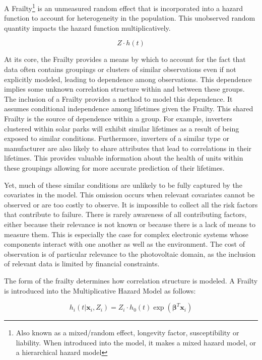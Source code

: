 A Frailty\footnote{Also known as a mixed/random effect, longevity factor, susceptibility or liability. When introduced into the model, it makes a mixed hazard model, or a hierarchical hazard model} is an unmeasured random effect that is incorporated into a hazard function to account for heterogeneity in the population\cite{Hosmer2008}. This unobserved random quantity impacts the hazard function multiplicatively.

$$ Z\cdot h(t) $$

At its core, the Frailty provides a means by which to account for the fact that data often contains groupings or clusters of similar observations even if not explicitly modeled, leading to dependence among observations. This dependence implies some unknown correlation structure within and between these groups. The inclusion of a Frailty provides a method to model this dependence. It assumes conditional independence among lifetimes given the Frailty. This shared Frailty is the source of dependence within a group\cite{Wienke2010}. For example, inverters clustered within solar parks will exhibit similar lifetimes as a result of being exposed to similar conditions. Furthermore, inverters of a similar type or manufacturer are also likely to share attributes that lead to correlations in their lifetimes. This provides valuable information about the health of units within these groupings allowing for more accurate prediction of their lifetimes.

Yet, much of these similar conditions are unlikely to be fully captured by the covariates in the model. This omission occurs when relevant covariates cannot be observed or are too costly to observe. It is impossible to collect all the risk factors that contribute to failure. There is rarely awareness of all contributing factors, either because their relevance is not known or because there is a lack of means to measure them. This is especially the case for complex electronic systems whose components interact with one another as well as the environment. The cost of observation is of particular relevance to the photovoltaic domain, as the inclusion of relevant data is limited by financial constraints.

The form of the frailty determines how correlation structure is modeled. A Frailty is introduced into the Multiplicative Hazard Model as follows:

$$ h_i(t|\textbf{x}_i, Z_i) = Z_i \cdot h_0(t) \exp(\boldsymbol\beta^T \textbf{x}_i)  $$


